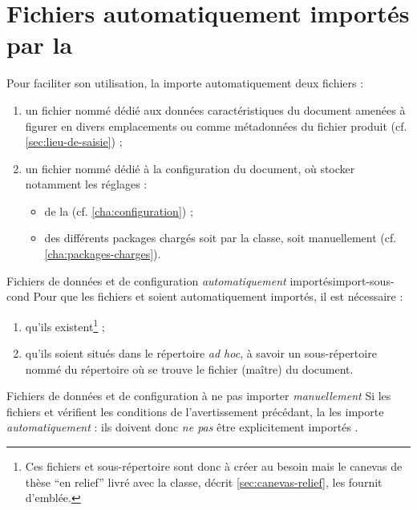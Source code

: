 \chapter{Fichiers automatiquement importés par la \yatcl{}}
\label{cha:fichiers-importes-par}

Pour faciliter son utilisation, la \yatcl{} importe automatiquement deux
fichiers :
\begin{enumerate}
\item un fichier nommé \file{\characteristicsfile} dédié aux données
  caractéristiques du document amenées à figurer en divers emplacements ou
  comme métadonnées du fichier \pdf produit (cf. \vref{sec:lieu-de-saisie}) ;
\item un fichier nommé \file{\configurationfile} dédié à la configuration du
  document, où stocker notamment les réglages :
  \begin{itemize}
  \item de la \yatcl (cf. \vref{cha:configuration}) ;
  \item des différents packages chargés soit par la classe, soit manuellement
    (cf. \vref{cha:packages-charges}).
  \end{itemize}
\end{enumerate}
\begin{dbwarning}{Fichiers de données et de configuration \emph{automatiquement} importés}{import-sous-cond}
  Pour que les fichiers \file{\characteristicsfile} et
  \file{\configurationfile} soient automatiquement importés, il est
  nécessaire :
  \begin{enumerate}
  \item qu'ils existent\footnote{Ces fichiers et sous-répertoire sont donc
      à créer au besoin mais le canevas de thèse \enquote{en relief} livré avec
      la classe, décrit \vref{sec:canevas-relief}, les fournit d'emblée.} ;
  \item qu'ils soient situés dans le répertoire \emph{ad hoc}, à savoir un
    sous-répertoire nommé \directory{\configurationdirectory} du répertoire où
    se trouve le fichier (maître) du document.
  \end{enumerate}
\end{dbwarning}
\begin{dbwarning}{Fichiers de données et de configuration à ne pas importer \emph{manuellement}}{}
  Si les fichiers \file{\characteristicsfile} et \file{\configurationfile}
  vérifient les conditions de l'avertissement précédant, la \yatcl{} les
  importe \emph{automatiquement} : ils doivent donc \emph{ne pas} être
  explicitement importés .
\end{dbwarning}
